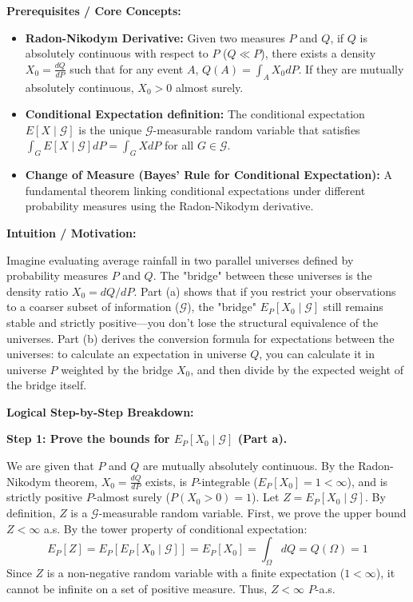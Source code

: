 \begin{solution}
\textbf{Prerequisites / Core Concepts:}
\begin{itemize}
    \item \textbf{Radon-Nikodym Derivative:} Given two measures $P$ and $Q$, if $Q$ is absolutely continuous with respect to $P$ ($Q \ll P$), there exists a density $X_0 = \frac{dQ}{dP}$ such that for any event $A$, $Q(A) = \int_A X_0 dP$. If they are mutually absolutely continuous, $X_0 > 0$ almost surely.
    \item \textbf{Conditional Expectation definition:} The conditional expectation $E[X \mid \mathcal{G}]$ is the unique $\mathcal{G}$-measurable random variable that satisfies $\int_G E[X \mid \mathcal{G}] dP = \int_G X dP$ for all $G \in \mathcal{G}$.
    \item \textbf{Change of Measure (Bayes' Rule for Conditional Expectation):} A fundamental theorem linking conditional expectations under different probability measures using the Radon-Nikodym derivative.
\end{itemize}

\textbf{Intuition / Motivation:}

Imagine evaluating average rainfall in two parallel universes defined by probability measures $P$ and $Q$. The "bridge" between these universes is the density ratio $X_0 = dQ/dP$. Part (a) shows that if you restrict your observations to a coarser subset of information ($\mathcal{G}$), the "bridge" $E_P[X_0 \mid \mathcal{G}]$ still remains stable and strictly positive—you don't lose the structural equivalence of the universes. Part (b) derives the conversion formula for expectations between the universes: to calculate an expectation in universe $Q$, you can calculate it in universe $P$ weighted by the bridge $X_0$, and then divide by the expected weight of the bridge itself.

\textbf{Logical Step-by-Step Breakdown:}

\textbf{Step 1: Prove the bounds for $E_P[X_0 \mid \mathcal{G}]$ (Part a).}

We are given that $P$ and $Q$ are mutually absolutely continuous. By the Radon-Nikodym theorem, $X_0 = \frac{dQ}{dP}$ exists, is $P$-integrable ($E_P[X_0] = 1 < \infty$), and is strictly positive $P$-almost surely ($P(X_0 > 0) = 1$).
Let $Z = E_P[X_0 \mid \mathcal{G}]$. By definition, $Z$ is a $\mathcal{G}$-measurable random variable.
First, we prove the upper bound $Z < \infty$ a.s.
By the tower property of conditional expectation:
\[ E_P[Z] = E_P[E_P[X_0 \mid \mathcal{G}]] = E_P[X_0] = \int_\Omega dQ = Q(\Omega) = 1 \]
Since $Z$ is a non-negative random variable with a finite expectation ($1 < \infty$), it cannot be infinite on a set of positive measure. Thus, $Z < \infty$ $P$-a.s.


\end{solution}
